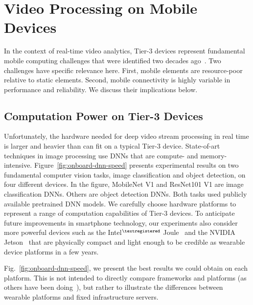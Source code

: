 \section{Video Processing on Mobile Devices}
\label{bw:challenges}

In the context of real-time video analytics, Tier-3 devices represent
fundamental mobile computing challenges that were identified two decades
ago~\cite{Satya1996}.  Two challenges have specific relevance here. First,
mobile elements are resource-poor relative to static elements.  Second, mobile
connectivity is highly variable in performance and reliability.  We discuss
their implications below.


\subsection{Computation Power on Tier-3 Devices}
\label{bw:payload}

Unfortunately, the hardware needed for deep video stream processing in real time
is larger and heavier than can fit on a typical Tier-3 device. State-of-art
techniques in image processing use DNNs that are compute- and memory-intensive.
Figure~\ref{fig:onboard-dnn-speed} presents experimental results on two
fundamental computer vision tasks, image classification and object detection, on
four different devices. In the figure, MobileNet V1 and ResNet101 V1 are image
classification DNNs. Others are object detection DNNs. Both tasks used publicly
available pretrained DNN models. We carefully choose hardware platforms to
represent a range of computation capabilities of Tier-3 devices. To anticipate
future improvements in smartphone technology, our experiments also consider more
powerful devices such as the Intel$^{\tiny\textregistered}$
Joule~\cite{Hardawar2016} and the NVIDIA Jetson~\cite{NVIDIA2017} that are
physically compact and light enough to be credible as wearable device platforms
in a few years.

Fig.~\ref{fig:onboard-dnn-speed}, we present the best results we could obtain on
each platform. This is not intended to directly compare frameworks and platforms
(as others have been doing~\cite{Zhang2018pcamp}), but rather to illustrate the
differences between wearable platforms and fixed infrastructure servers. 

